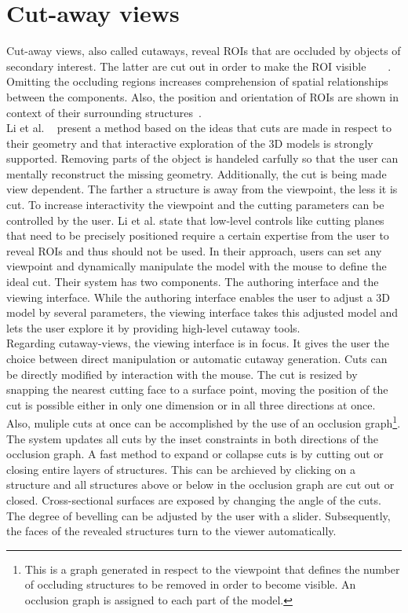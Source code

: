 \section{Cut-away views}
Cut-away views, also called cutaways, reveal ROIs that are occluded by objects of secondary interest. The latter are cut out in order to make the ROI visible~\cite{proc:volumeshop}~\cite{jour:adaptiveCutaways}~\cite{jour:correa}~\cite{incoll:cutawayIllustration}. Omitting the occluding regions increases comprehension of spatial relationships between the components. Also, the position and orientation of ROIs are shown in context of their surrounding structures~\cite{jour:interactiveCutaway}.\\
\newline
Li et al. ~\cite{jour:interactiveCutaway} present a method based on the ideas that cuts are made in respect to their geometry and that interactive exploration of the 3D models is strongly supported. Removing parts of the object is handeled carfully so that the user can mentally reconstruct the missing geometry. Additionally, the cut is being made view dependent. The farther a structure is away from the viewpoint, the less it is cut. To increase interactivity the viewpoint and the cutting parameters can be controlled by the user. Li et al. state that low-level controls like cutting planes that need to be precisely positioned require a certain expertise from the user to reveal ROIs and thus should not be used. In their approach, users can set any viewpoint and dynamically manipulate the model with the mouse to define the ideal cut. Their system has two components. The authoring interface and the viewing interface. While the authoring interface enables the user to adjust a 3D model by several parameters, the viewing interface takes this adjusted model and lets the user explore it by providing high-level cutaway tools.\\
Regarding cutaway-views, the viewing interface is in focus. It gives the user the choice between direct manipulation or automatic cutaway generation. Cuts can be directly modified by interaction with the mouse. The cut is resized by snapping the nearest cutting face to a surface point, moving the position of the cut is possible either in only one dimension or in all three directions at once. Also, muliple cuts at once can be accomplished by the use of an occlusion graph\footnote{This is a graph generated in respect to the viewpoint that defines the number of occluding structures to be removed in order to become visible. An occlusion graph is assigned to each part of the model.}. The system updates all cuts by the inset constraints in both directions of the occlusion graph. A fast method to expand or collapse cuts is by cutting out or closing entire layers of structures. This can be archieved by clicking on a structure and all structures above or below in the occlusion graph are cut out or closed. Cross-sectional surfaces are exposed by changing the angle of the cuts. The degree of bevelling can be adjusted by the user with a slider. Subsequently, the faces of the revealed structures turn to the viewer automatically.\\
